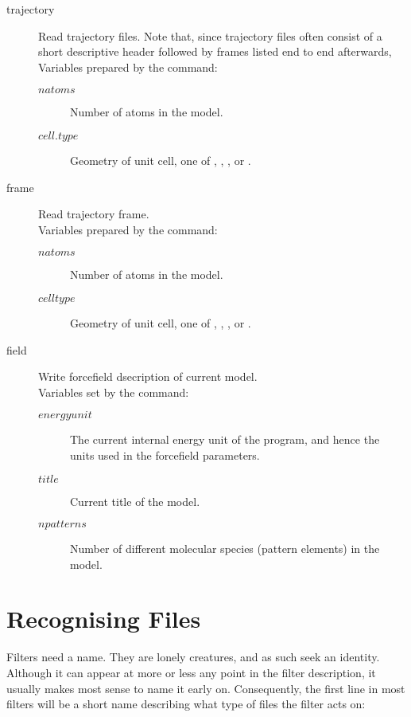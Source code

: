 \begin{description}
	\item[trajectory]
	Read trajectory files. Note that, since trajectory files often consist of a short descriptive header followed by frames listed end to end afterwards, 
	Variables prepared by the command:
	\begin{description}
		\item[$natoms$\its]
			Number of atoms in the model.
		\item[$cell.type$\its]
			Geometry of unit cell, one of , , , or .
	\end{description}

	\item[frame]
	Read trajectory frame.\\
	Variables prepared by the command:
	\begin{description}
		\item[$natoms$\its]
			Number of atoms in the model.
		\item[$celltype$\its]
			Geometry of unit cell, one of , , , or .
	\end{description}

	\item[field]
	Write forcefield dsecription of current model.\\
	Variables set by the command:
	\begin{description}
		\item[$energyunit$\its]
			The current internal energy unit of the program, and hence the units used in the forcefield parameters.
		\item[$title$\its]
			Current title of the model.
		\item[$npatterns$\its]
			Number of different molecular species (pattern elements) in the model.
	\end{description}

\end{description}

\section{Recognising Files}
\label{sec:filterrecog}

Filters need a name. They are lonely creatures, and as such seek an identity. Although it can appear at more or less any point in the filter description, it usually makes most sense to name it early on. Consequently, the first line in most filters will be a short name describing what type of files the filter acts on:

